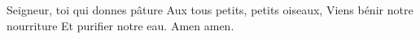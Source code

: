 \beginverse*
Seigneur, toi qui donnes pâture
Aux tous petits, petits oiseaux,
Viens bénir notre nourriture
Et purifier notre eau.
Amen amen.
\endverse
\endsong
